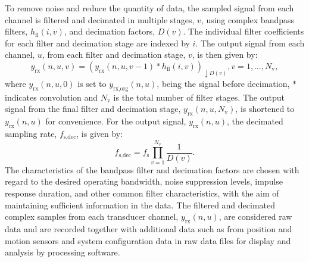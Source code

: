 \documentclass[preprint,12pt,TurnOnLineNumbers]{JASAnew}
\newcommand{\samplesymt}{n}
\newcommand{\genidxsym}{i}
\newcommand{\channelsym}{u}
\newcommand{\stagesym}{v}
\newcommand{\nstages}{N_{\textrm{v}}}
\newcommand{\fs}{f_{\textrm{s}}}
\newcommand{\fsdec}{f_{\textrm{s,dec}}}
\newcommand{\yrx}{y_{\textrm{rx}}}
\newcommand{\yrxorg}{y_{\textrm{rx,org}}}
\newcommand{\decfac}{D}
\newcommand{\hfl}{h_{\textrm{fl}}}
\begin{document}
To remove noise and reduce the quantity of data, the sampled signal from each channel is filtered and decimated in multiple stages, $\stagesym$, using complex bandpass filters, $\hfl(\genidxsym,\stagesym)$, and decimation factors, $\decfac(\stagesym)$. The individual filter coefficients for each filter and decimation stage are indexed by $i$. The output signal from each channel, $\channelsym$, from each filter and decimation stage, $\stagesym$, is then given by:
%
\begin{equation}
\label{eq:yrx}
\yrx(\samplesymt,\channelsym,\stagesym) = \left( \yrx(\samplesymt,\channelsym,\stagesym-1) * \hfl(\genidxsym,\stagesym) \right)_{\downarrow \decfac(\stagesym)}, 
\stagesym = 1,\ldots,\nstages,
\end{equation}
%
where $\yrx(\samplesymt,\channelsym,0)$ is set to $\yrxorg(\samplesymt,\channelsym)$, being the signal before decimation, $*$ indicates convolution and $\nstages$ is the total number of filter stages. The output signal from the final filter and decimation stage, $\yrx(\samplesymt,\channelsym,\nstages)$, is shortened to $\yrx(\samplesymt,\channelsym)$ for convenience. For the output signal, $\yrx(\samplesymt,\channelsym)$, the decimated sampling rate, $\fsdec$, is given by:
%
\begin{equation}
\label{eq:fsdec}
\fsdec = \fs\prod_{\stagesym=1}^{\nstages} \frac{1}{\decfac(\stagesym)}.
\end{equation}
%
The characteristics of the bandpass filter and decimation factors are chosen with regard to the desired operating bandwidth, noise suppression levels, impulse response duration, and other common filter characteristics, with the aim of maintaining sufficient information in the data. The filtered and decimated complex samples from each transducer channel, $\yrx(\samplesymt,\channelsym)$, are considered raw data and are recorded together with additional data such as from position and motion sensors and system configuration data in raw data files for display and analysis by processing software.
\end{document}
